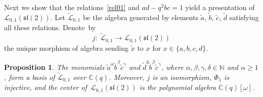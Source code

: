 \documentclass[pdftex]{sigma}%
\numberwithin{equation}{section}
\numberwithin{figure}{section}
\newtheorem{prop}[teo]{Proposition}
\newcommand{\mc}{\mathbb{C}}
\newcommand{\mn}{\mathbb{N}}
\newcommand{\Ll}{{\mathcal L}}
\begin{document}
Next we show that the relations~\eqref{rel01} and $ad-q^2bc=1$ yield a presentation of ${\mathcal L}_{0,1}({\mathfrak{sl}}(2))$.
Let $\tilde{\mathcal L}_{0,1}$ be the algebra generated by elements $\tilde{a}$, $\tilde{b}$, $\tilde{c}$, $\tilde{d}$ satisfying all these relations. De\-note~by
\[
j\colon \ \tilde{\mathcal L}_{0,1}\to {\mathcal L}_{0,1}({\mathfrak{sl}}(2))
\]
the unique morphism of algebra sending $\tilde{x}$ to $x$ for $x\in \{a,b,c,d\}.$

\begin{prop}\label{drinfeldinj} The monomials $\tilde{a}^\alpha \tilde{b}^\beta \tilde{c}^\gamma$ and $\tilde{d}^\delta \tilde{b}^\beta \tilde{c}^\gamma$, where $\alpha, \beta, \gamma, \delta\in \mn$ and $\alpha \geq 1$, form a basis of $\tilde{\Ll}_{0,1}$ over $\mc(q)$. Moreover, $j$ is an isomorphism, $\Phi_1$ is injective, and the center of~$\Ll_{0,1}({\mathfrak{sl}}(2))$ is the polynomial algebra $\mc(q)[\omega]$.
\end{prop}
\end{document}
